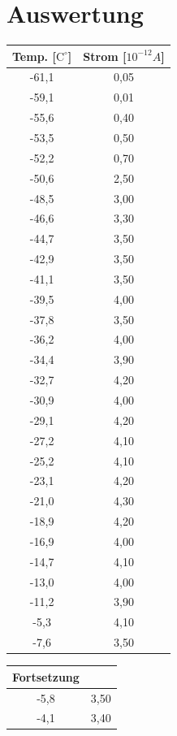 \section{Auswertung}
\begin{table}
\begin{minipage}{0.45\textwidth}
\begin{tabular}{c|c}
Temp. [$\text{C}^\circ$] & Strom [$10^{-12}A$]\\\hline
-61,1	&0,05\\\hline
-59,1	&0,01\\\hline
-55,6	&0,40\\\hline
-53,5	&0,50\\\hline
-52,2	&0,70\\\hline
-50,6	&2,50\\\hline
-48,5	&3,00\\\hline
-46,6	&3,30\\\hline
-44,7	&3,50\\\hline
-42,9	&3,50\\\hline
-41,1	&3,50\\\hline
-39,5	&4,00\\\hline
-37,8	&3,50\\\hline
-36,2	&4,00\\\hline
-34,4	&3,90\\\hline
-32,7	&4,20\\\hline
-30,9	&4,00\\\hline
-29,1	&4,20\\\hline
-27,2	&4,10\\\hline
-25,2	&4,10\\\hline
-23,1	&4,20\\\hline
-21,0	&4,30\\\hline
-18,9	&4,20\\\hline
-16,9	&4,00\\\hline
-14,7	&4,10\\\hline
-13,0	&4,00\\\hline
-11,2	&3,90\\\hline
-5,3	&4,10\\\hline
-7,6	&3,50\\\hline
\end{tabular}
\end{minipage}
\begin{minipage}{0.45\textwidth}
\begin{tabular}{c|c}
Fortsetzung & \\\hline
-5,8	&3,50\\\hline
-4,1	&3,40\\\hline

\end{tabular}
\end{minipage}
\end{table}
